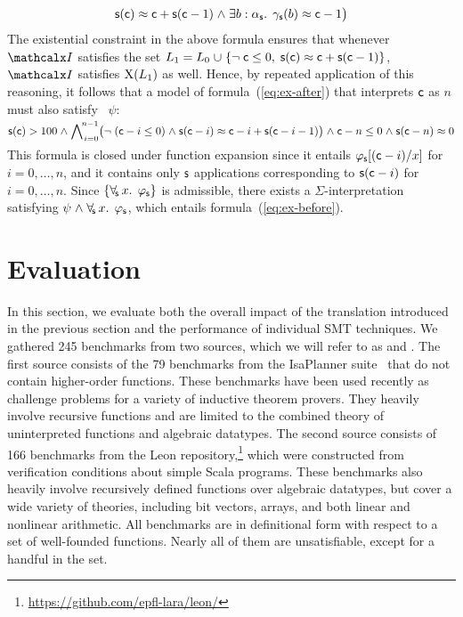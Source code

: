 \begin{example}
\[            \con{s}(\con{c}) \teq \con{c} + \con{s}( \con{c}-1 )
            \wedge \exists b : {\fargtype{\con{s}}}.\;\, \farg{\con{s}}( b ) \teq \con{c}-1 \bigr)
\]
The existential constraint in the above formula
ensures that whenever $\I$ satisfies the set $L_1 = L_0 \cup \{ \neg \con{c} \leq 0,\; \con{s}(\con{c}) \teq \con{c} + \con{s}( \con{c}-1 ) \}$,
$\I$ satisfies $\mathrm{X}( L_1 )$ as well.
Hence, by repeated application of this reasoning, it follows that
a model of formula~(\ref{eq:ex-after}) that interprets $\mathsf{c}$ as $n$ must also satisfy%
~$\psi$:
%
\[\con{s}( \con{c} ) > 100 \wedge %
  \smash{\bigwedge\nolimits_{\vthinspace i=0}^{\!n-1}} \bigl( \neg (\con{c}-i \leq 0) \wedge \con{s}( \con{c}-i ) \teq \con{c}-i + \con{s}( \con{c}-i-1 ) \bigr)
\wedge \con{c}-n \leq 0 \wedge \con{s}( \con{c}-n ) \teq 0\]
%
This formula is closed under function expansion
since it entails $\varphi_{\mathsf{s}}[(\mathsf{c}-i)/x]$ for $i = 0, \ldots, n$,
and it contains only $\mathsf{s}$ applications corresponding to $\mathsf{s}( \mathsf{c}-i )$ for $i = 0, \ldots, n$.
Since $\{\forall_{\!\mathsf{s}\:} x.\;\, \varphi_{\mathsf{s}}\}$ is admissible,
there exists a $\Sigma$-interpretation satisfying $\psi \wedge \forallf{\con{s}} x.\;\, \varphi_\con{s}$,
which entails formula~(\ref{eq:ex-before}).\xend
\end{example}

\section{Evaluation}
\label{sec:evaluation}

{
In this section, we evaluate both the overall impact of the translation
introduced in the previous section and the performance of individual SMT
techniques.
%
We gathered 245 benchmarks from two sources, which we will refer to as
\isa and \leon. The first source consists of the 79
benchmarks from the IsaPlanner
suite~\cite{DBLP:conf/itp/JohanssonDB10} that do not contain higher-order
functions. These benchmarks have been used recently as challenge problems for a
variety of inductive theorem provers. They heavily involve
recursive functions and are limited to the combined theory of uninterpreted
functions and algebraic datatypes. The second source consists of 166
benchmarks from the Leon repository,\footnote{%
\url{https://github.com/epfl-lara/leon/}} which were constructed from
verification conditions about simple Scala programs. These benchmarks also
heavily involve recursively defined functions over algebraic datatypes, 
but cover a wide variety of theories, including bit vectors, arrays, and
both linear and nonlinear arithmetic. All benchmarks are in definitional form
with respect to a set of well-founded functions.
%
Nearly all of them are unsatisfiable, except for a
handful in the \leon set.

}

